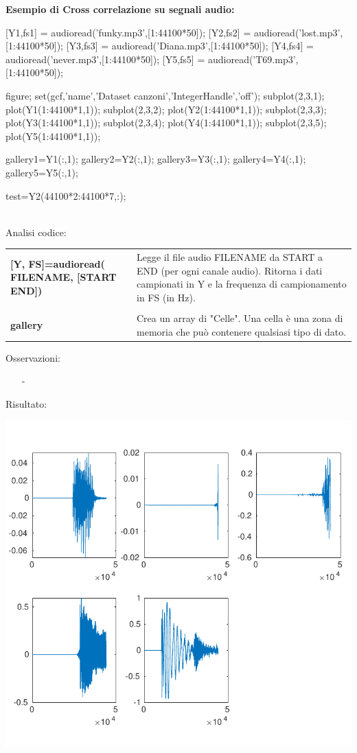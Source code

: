 \documentclass[a4paper, 10pt]{report}
\begin{document}
\noindent \textbf{Esempio di Cross correlazione su segnali audio:}

\begin{code}
[Y1,fs1] = audioread('funky.mp3',[1:44100*50]);
[Y2,fs2] = audioread('lost.mp3',[1:44100*50]);
[Y3,fs3] = audioread('Diana.mp3',[1:44100*50]);
[Y4,fs4] = audioread('never.mp3',[1:44100*50]);
[Y5,fs5] = audioread('T69.mp3',[1:44100*50]);

figure; set(gcf,'name','Dataset canzoni','IntegerHandle','off');
subplot(2,3,1); plot(Y1(1:44100*1,1));
subplot(2,3,2); plot(Y2(1:44100*1,1));
subplot(2,3,3); plot(Y3(1:44100*1,1));
subplot(2,3,4); plot(Y4(1:44100*1,1));
subplot(2,3,5); plot(Y5(1:44100*1,1));


gallery{1}=Y1(:,1);
gallery{2}=Y2(:,1);
gallery{3}=Y3(:,1);
gallery{4}=Y4(:,1);
gallery{5}=Y5(:,1);

test=Y2(44100*2:44100*7,:);
\end{code}

\noindent \\Analisi codice:
\begin{longtable}{| p{} | p{} |}

\textbf{[Y, FS]=audioread( FILENAME, [START END])} & Legge il file audio FILENAME da START a END (per ogni canale audio). Ritorna i dati campionati in Y e la frequenza di campionamento in FS (in Hz).
\\\\
\textbf{gallery} & Crea un array di "Celle". Una cella è una zona di memoria che può contenere qualsiasi tipo di dato.
\\

\end{longtable}

\noindent Osservazioni:
\begin{itemize}
\item[-] 
\end{itemize}

\noindent Risultato:

\begin{center}
\includegraphics[scale=0.8]{es4.pdf}
\end{center}
\end{document}
